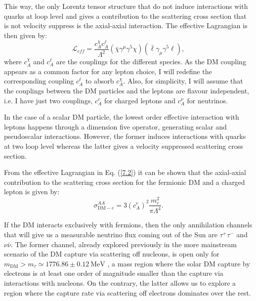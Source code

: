 This way, the only Lorentz tensor structure that do not induce interactions with quarks at loop level and gives a contribution to the scattering cross section that is not velocity suppress is the axial-axial interaction. The effective Lagrangian is then given by:
\begin{equation}\label{7.2}
	\mathcal{L}_{eff} = \frac{c_{A}^{\chi} c_{A}^{\ell}}{\Lambda^{2}} \left(\bar{\chi} \gamma^{\mu}\gamma^{5} \chi\right)\left(\bar{\ell} \gamma_{\mu}\gamma^{5} \ell\right),
\end{equation}
where $c_{A}^{\chi}$ and $c_{A}^{\ell}$ are the couplings for the different species. As the DM coupling appears as a common factor for any lepton choice, I will redefine the corresponding coupling $c_{A}^{\ell}$ to absorb $c_{A}^{\chi}$. Also, for simplicity, I will assume that the couplings between the DM particles and the leptons are flavour independent, i.e. I have just two couplings, $c_{A}^{e}$ for charged leptons and $c_{A}^{\nu}$ for neutrinos.

In the case of a scalar DM particle, the lowest order effective interaction with leptons happens through a dimension five operator, generating scalar and pseudoscalar interactions. However, the former induces interactions with quarks at two loop level whereas the latter gives a velocity suppressed scattering cross section.

From the effective Lagrangian in Eq. (\ref{7.2}) it can be shown that the axial-axial contribution to the scattering cross section for the fermionic DM and a charged lepton is given by:
\begin{equation}\label{7.3}
	\sigma_{\mathrm{DM}-e}^{AA} = 3 \left(c_{A}^{e}\right)^{2} \frac{m_{e}^{2}}{\pi \Lambda^{4}}.
\end{equation}

If the DM interacts exclusively with fermions, then the only annihilation channels that will give us a measurable neutrino flux coming out of the Sun are $\tau^{+}\tau^{-}$ and $\nu\bar{\nu}$. The former channel, already explored previously in the more mainstream scenario of the DM capture via scattering off nucleons, is open only for $m_{\mathrm{DM}} > m_{\tau} \simeq 1776.86 \pm 0.12 \ \mathrm{MeV}$ \cite{ParticleDataGroup2020}, a mass region where the solar DM capture by electrons is at least one order of magnitude smaller than the capture via interactions with nucleons. On the contrary, the latter allows us to explore a region where the capture rate via scattering off electrons dominates over the rest.


